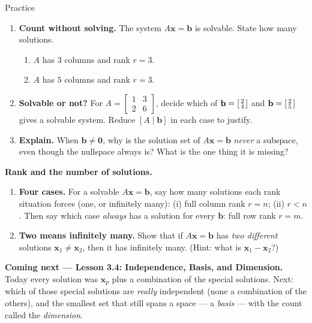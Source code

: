 \documentclass[10pt]{article}
\newcommand{\xx}{\mathbf{x}}
\newcommand{\bb}{\mathbf{b}}
\newcommand{\zero}{\mathbf{0}}
\begin{document}
\begin{notesbox}{Practice}
\begin{enumerate}[leftmargin=1.9em, itemsep=11pt]
\begin{enumerate}[label=(\alph*), leftmargin=1.8em, itemsep=6pt]
    \end{enumerate}
  \item \textbf{Count without solving.} The system $A\xx=\bb$ is solvable. State how many solutions.
    \begin{enumerate}[label=(\alph*), leftmargin=1.8em, itemsep=4pt]
      \item $A$ has $3$ columns and rank $r=3$. \hfill
      \item $A$ has $5$ columns and rank $r=3$. \hfill
    \end{enumerate}
    \vspace{0.7cm}
  \item \textbf{Solvable or not?} For $A=\begin{bmatrix} 1 & 3 \\ 2 & 6 \end{bmatrix}$, decide which of
        $\bb=\begin{bsmallmatrix} 2\\4 \end{bsmallmatrix}$ and $\bb=\begin{bsmallmatrix} 2\\5 \end{bsmallmatrix}$
        gives a solvable system. Reduce $[A\mid\bb]$ in each case to justify. 
  \item \textbf{Explain.} When $\bb\ne\zero$, why is the solution set of $A\xx=\bb$ \emph{never} a
        subspace, even though the nullspace always is? What is the one thing it is missing? 
\end{enumerate}
\end{notesbox}

\begin{extensionbox}
\textbf{Rank and the number of solutions.}
\begin{enumerate}[label=(\alph*), leftmargin=1.8em, itemsep=5pt]
  \item \textbf{Four cases.} For a solvable $A\xx=\bb$, say how many solutions each rank situation forces
        (one, or infinitely many): (i) full column rank $r=n$; (ii) $r<n$. Then say which case
        \emph{always} has a solution for every $\bb$: full row rank $r=m$.
  \item \textbf{Two means infinitely many.} Show that if $A\xx=\bb$ has \emph{two different} solutions
        $\xx_1\ne\xx_2$, then it has infinitely many. (Hint: what is $\xx_1-\xx_2$?)
\end{enumerate}
\end{extensionbox}

\begin{spiralbox}
\textbf{Coming next --- Lesson 3.4: Independence, Basis, and Dimension.} Today every solution was
$\xx_p$ plus a combination of the special solutions. Next: which of those special solutions are
\emph{really} independent (none a combination of the others), and the smallest set that still spans a
space --- a \emph{basis} --- with the count called the \emph{dimension}.
\end{spiralbox}
\end{document}
